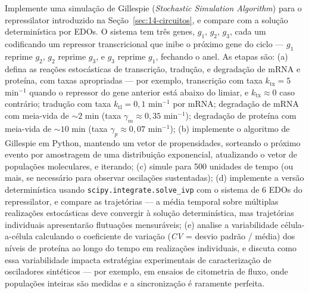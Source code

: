 \begin{exercicio}
Implemente uma simulação de Gillespie (\emph{Stochastic Simulation Algorithm}) para o repressilator introduzido na Seção~\ref{sec:14-circuitos}, e compare com a solução determinística por EDOs. O sistema tem três genes, $g_1$, $g_2$, $g_3$, cada um codificando um repressor transcricional que inibe o próximo gene do ciclo --- $g_1$ reprime $g_2$, $g_2$ reprime $g_3$, e $g_3$ reprime $g_1$, fechando o anel. As etapas são: (a) defina as reações estocásticas de transcrição, tradução, e degradação de mRNA e proteína, com taxas apropriadas --- por exemplo, transcrição com taxa $k_{\text{tx}} = 5$ min$^{-1}$ quando o repressor do gene anterior está abaixo do limiar, e $k_{\text{tx}} \approx 0$ caso contrário; tradução com taxa $k_{\text{tl}} = 0{,}1$ min$^{-1}$ por mRNA; degradação de mRNA com meia-vida de $\sim 2$ min (taxa $\gamma_m \approx 0{,}35$ min$^{-1}$); degradação de proteína com meia-vida de $\sim 10$ min (taxa $\gamma_p \approx 0{,}07$ min$^{-1}$); (b) implemente o algoritmo de Gillespie em Python, mantendo um vetor de propensidades, sorteando o próximo evento por amostragem de uma distribuição exponencial, atualizando o vetor de populações moleculares, e iterando; (c) simule para 500 unidades de tempo (ou mais, se necessário para observar oscilações sustentadas); (d) implemente a versão determinística usando \texttt{scipy.integrate.solve\_ivp} com o sistema de 6 EDOs do repressilator, e compare as trajetórias --- a média temporal sobre múltiplas realizações estocásticas deve convergir à solução determinística, mas trajetórias individuais apresentarão flutuações mensuráveis; (e) analise a variabilidade célula-a-célula calculando o coeficiente de variação (\emph{CV} = desvio padrão / média) dos níveis de proteína ao longo do tempo em realizações individuais, e discuta como essa variabilidade impacta estratégias experimentais de caracterização de osciladores sintéticos --- por exemplo, em ensaios de citometria de fluxo, onde populações inteiras são medidas e a sincronização é raramente perfeita.
\end{exercicio}

